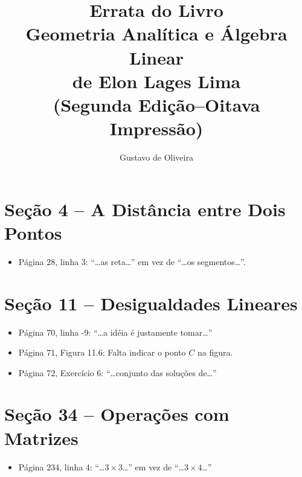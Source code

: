 \documentclass[a4paper,11pt]{article}
\title{Errata do Livro\\Geometria Analítica e Álgebra Linear\\de Elon Lages Lima\\(Segunda Edição--Oitava Impressão)}
\author{Gustavo de Oliveira}
\begin{document}
\maketitle

\section*{Seção 4 -- A Distância entre Dois Pontos}

\begin{itemize}
  \item
    Página 28, linha 3: ``\dots as reta\dots'' em vez de ``\dots os segmentos\dots''.
\end{itemize}

\section*{Seção 11 -- Desigualdades Lineares}

\begin{itemize}
  \item
    Página 70, linha -9: ``\dots a idéia é justamente tomar\dots''
  \item
    Página 71, Figura 11.6: Falta indicar o ponto $C$ na figura.
  \item
    Página 72, Exercício 6: ``\dots conjunto das soluções de\dots''
\end{itemize}

\section*{Seção 34 -- Operações com Matrizes}

\begin{itemize}
  \item
    Página 234, linha 4: ``\dots $3 \times 3$\dots'' em vez de ``\dots $3 \times 4$\dots''
\end{itemize}
\end{document}
